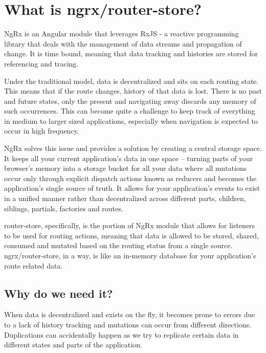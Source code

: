 \maketitle{}
\section{ What is ngrx/router-store? }

NgRx is an Angular module that leverages RxJS -  a reactive programming library
that deals with the management of data streams and propagation of change. It is
time bound, meaning that data tracking and histories are stored for referencing
and tracing.

Under the traditional model, data is decentralized and sits on each routing
state. This means that if the route changes, history of that data is lost. There
is no past and future states, only the present and navigating away discards any
memory of such occurrences. This can become quite a challenge to keep track of
everything in medium to larger sized applications, especially when navigation
is expected to occur in high frequency.

NgRx solves this issue and provides a solution by creating a central storage
space. It keeps all your current application’s data in one space – turning parts
of your browser’s memory into a  storage bucket for all your data where all
mutations occur only through explicit dispatch actions known as reducers and
becomes the application’s single source of truth. It allows for your
application’s events to exist in a unified manner rather than decentralized
across different parts, children, siblings, partials, factories and routes.

router-store, specifically, is the portion of NgRx module that allows for
listeners to be used for routing actions, meaning that data is allowed to be
stored, shared, consumed and mutated based on the routing status from
a single source. ngrx/router-store, in a way, is like an in-memory database
for your application’s route related data.

\subsection{Why do we need it?}
When data is decentralized and exists on the fly, it becomes prone to errors due
to a lack of history tracking and mutations can occur from different directions.
Duplications can accidentally happen as we try to replicate certain data in
different states and parts of the application.

